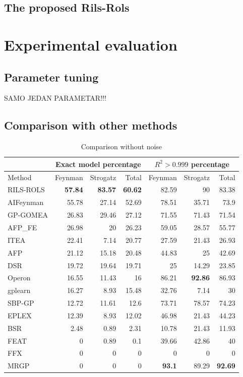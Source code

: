 \documentclass[a4paper,12pt]{elsarticle}
\begin{document}
   \subsection{The proposed Rils-Rols}
\section{Experimental evaluation}\label{sec:experiments}

\subsection{Parameter tuning}
SAMO JEDAN PARAMETAR!!!

\subsection{Comparison with other methods}

\begin{table}[!htb]
	\caption{Comparison without noise}\label{tab:comp_noise0}
	\centering
		\begin{tabular}{l|rrr|rrr} \hline
			& \multicolumn{3}{c|}{Exact model percentage} & \multicolumn{3}{c}{$R^2 > 0.999$ percentage}\\ \hline
			Method & Feynman & Strogatz & Total & Feynman & Strogatz & Total \\ \hline
			RILS-ROLS&\bf{57.84}&\bf{83.57}&\bf{60.62}&82.59&90&83.38\\
			AIFeynman&55.78&27.14&52.69&78.51&35.71&73.9\\
			GP-GOMEA&26.83&29.46&27.12&71.55&71.43&71.54\\
			AFP\_FE&26.98&20&26.23&59.05&28.57&55.77\\
			ITEA&22.41&7.14&20.77&27.59&21.43&26.93\\
			AFP&21.12&15.18&20.48&44.83&25&42.69\\
			DSR&19.72&19.64&19.71&25&14.29&23.85\\
			Operon&16.55&11.43&16&86.21&\bf{92.86}&86.93\\
			gplearn&16.27&8.93&15.48&32.76&7.14&30\\
			SBP-GP&12.72&11.61&12.6&73.71&78.57&74.23\\
			EPLEX&12.39&8.93&12.02&46.98&21.43&44.23\\
			BSR&2.48&0.89&2.31&10.78&21.43&11.93\\
			FEAT&0&0.89&0.1&39.66&42.86&40\\
			FFX&0&0&0&0&0&0\\
			MRGP&0&0&0&\bf{93.1}&89.29&\bf{92.69}\\
			\hline
		\end{tabular}
\end{table}
\end{document}
